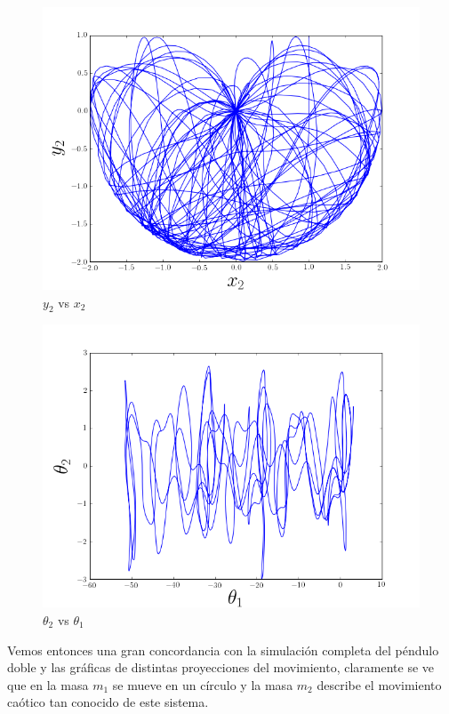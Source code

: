 \documentclass[a4paper,10pt]{article}
\numberwithin{equation}{section}
\begin{document}
\begin{figure}[H]
\center
\includegraphics[scale=0.5]{problema2fig5}
\caption{$y_2$ vs $x_2$}
\label{fig:problema2fig5}
\end{figure}

\begin{figure}[H]
\center
\includegraphics[scale=0.5]{problema2fig6}
\caption{$\theta_2$ vs $\theta_1$}
\label{fig:problema2fig6}
\end{figure}

Vemos entonces una gran concordancia con la simulación completa del péndulo doble y las 
gráficas de distintas proyecciones del movimiento, claramente se ve que en la masa 
$m_1$ se mueve en un círculo y la masa $m_2$ describe el movimiento caótico
tan conocido de este sistema.
\end{document}
